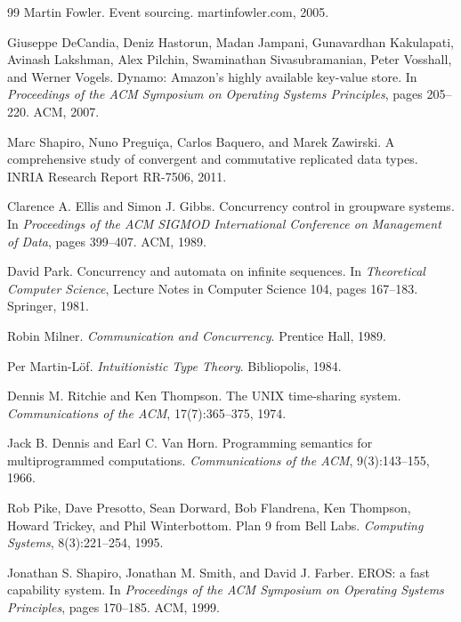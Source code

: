 \documentclass[11pt]{article}
\theoremstyle{definition}
\theoremstyle{plain}
\theoremstyle{remark}
\begin{document}
\begin{thebibliography}{99}
Martin Fowler.
\newblock Event sourcing.
\newblock martinfowler.com, 2005.

Giuseppe DeCandia, Deniz Hastorun, Madan Jampani, Gunavardhan Kakulapati, Avinash Lakshman, Alex Pilchin, Swaminathan Sivasubramanian, Peter Vosshall, and Werner Vogels.
\newblock Dynamo: Amazon's highly available key-value store.
\newblock In \textit{Proceedings of the ACM Symposium on Operating Systems Principles}, pages 205--220. ACM, 2007.

Marc Shapiro, Nuno Preguiça, Carlos Baquero, and Marek Zawirski.
\newblock A comprehensive study of convergent and commutative replicated data types.
\newblock INRIA Research Report RR-7506, 2011.

Clarence A. Ellis and Simon J. Gibbs.
\newblock Concurrency control in groupware systems.
\newblock In \textit{Proceedings of the ACM SIGMOD International Conference on Management of Data}, pages 399--407. ACM, 1989.

David Park.
\newblock Concurrency and automata on infinite sequences.
\newblock In \textit{Theoretical Computer Science}, Lecture Notes in Computer Science 104, pages 167--183. Springer, 1981.

Robin Milner.
\newblock \textit{Communication and Concurrency}.
\newblock Prentice Hall, 1989.

Per Martin-Löf.
\newblock \textit{Intuitionistic Type Theory}.
\newblock Bibliopolis, 1984.

Dennis M. Ritchie and Ken Thompson.
\newblock The UNIX time-sharing system.
\newblock \textit{Communications of the ACM}, 17(7):365--375, 1974.

Jack B. Dennis and Earl C. Van Horn.
\newblock Programming semantics for multiprogrammed computations.
\newblock \textit{Communications of the ACM}, 9(3):143--155, 1966.

Rob Pike, Dave Presotto, Sean Dorward, Bob Flandrena, Ken Thompson, Howard Trickey, and Phil Winterbottom.
\newblock Plan 9 from Bell Labs.
\newblock \textit{Computing Systems}, 8(3):221--254, 1995.

Jonathan S. Shapiro, Jonathan M. Smith, and David J. Farber.
\newblock EROS: a fast capability system.
\newblock In \textit{Proceedings of the ACM Symposium on Operating Systems Principles}, pages 170--185. ACM, 1999.


\end{thebibliography}
\end{document}
